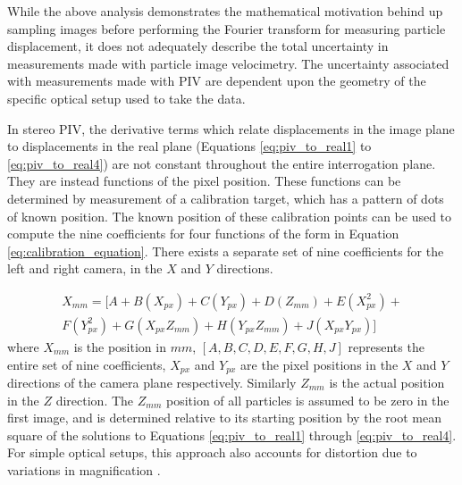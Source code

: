 

While the above analysis demonstrates the mathematical motivation behind up 
sampling images before performing the Fourier transform for measuring particle 
displacement, it does not adequately describe the total uncertainty in 
measurements made with particle image velocimetry. The uncertainty associated 
with measurements made with PIV are dependent upon the geometry of the specific 
optical setup used to take the data.

In stereo PIV,  the 
derivative terms which relate displacements in the image plane to displacements 
in the real plane (Equations \ref{eq:piv_to_real1} to \ref{eq:piv_to_real4}) 
are not constant throughout the entire interrogation plane. They are instead 
functions of the pixel position. These functions can be determined by 
measurement of a calibration target, which has a pattern of dots of known 
position. The known position of these calibration points can 
be used to compute the nine coefficients for four functions of the form in 
Equation \ref{eq:calibration_equation}. There exists a separate set of nine 
coefficients for the left and right camera, in the $X$ and $Y$ directions.

\begin{equation}
	\begin{multlined}
	X_{mm} =  [A + B(X_{px}) + C(Y_{px}) + D(Z_{mm}) + E(X_{px}^2) + \\
	F(Y_{px}^2) + G(X_{px}Z_{mm}) + H(Y_{px}Z_{mm}) + J(X_{px}Y_{px})]
	\end{multlined}
	\label{eq:calibration_equation}
\end{equation}
\newline
\noindent
where $X_{mm}$ is the position in $mm$, $[A, B, C, D, E, F, G, H, J]$ 
represents the entire set of nine coefficients, $X_{px}$ and $Y_{px}$ are the 
pixel positions in the $X$ and $Y$ directions of the camera plane 
respectively. Similarly $Z_{mm}$ is the actual position in the $Z$ direction. 
The 
$Z_{mm}$ position of all particles is assumed to be zero in the first image, 
and is determined relative to its starting position by the root mean square of 
the solutions to Equations \ref{eq:piv_to_real1} through \ref{eq:piv_to_real4}.
For simple optical setups, this approach also accounts for distortion due to 
variations in magnification \cite{soloff1997, willert1997}.


